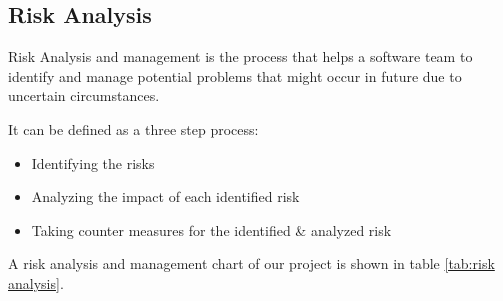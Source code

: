 \documentclass[11pt]{article} %
\begin{document}
	\subsection{Risk Analysis}
	Risk Analysis and management is the process that helps a software team to identify and manage potential problems that might occur in future due to uncertain circumstances.
	
	It can be defined as a three step process:
	\begin{itemize}
	    \item Identifying the risks
        \item Analyzing the impact of each identified risk
        \item Taking counter measures for the identified \& analyzed         risk
	\end{itemize}
	
	A risk analysis and management chart of our project is shown in table \ref{tab:risk analysis}. 
    
\end{document}
